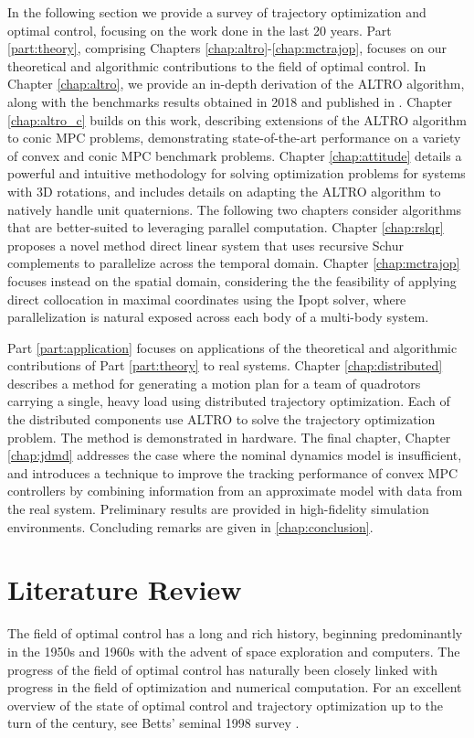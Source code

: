 \documentclass[../root.tex]{subfiles}
\begin{document}
In the following section we provide a survey of trajectory optimization and
optimal control, focusing on the work done in the last 20 years. Part
\ref{part:theory}, comprising Chapters
\ref{chap:altro}-\ref{chap:mctrajop}, focuses on our theoretical and
algorithmic contributions to the field of optimal control. In Chapter
\ref{chap:altro}, we provide an in-depth derivation of the ALTRO algorithm, along
with the benchmarks results obtained in 2018 and published in
\cite{howell_ALTRO_2019}. Chapter \ref{chap:altro_c} builds on this work,
describing extensions of the ALTRO algorithm to conic MPC problems,
demonstrating state-of-the-art performance on a variety of convex and conic MPC 
benchmark problems.
Chapter \ref{chap:attitude} details a powerful and intuitive methodology 
for solving optimization problems for systems with 3D rotations, and includes
details on adapting the ALTRO algorithm to natively handle unit quaternions. 
The following two chapters consider algorithms that are better-suited to 
leveraging parallel computation. Chapter \ref{chap:rslqr} proposes a novel method direct 
linear system that uses recursive Schur complements to parallelize across the temporal 
domain. Chapter \ref{chap:mctrajop} focuses instead on the spatial domain, considering the
the feasibility of applying direct collocation in maximal coordinates using the Ipopt 
solver, where parallelization is natural exposed across each body of a multi-body 
system.

Part \ref{part:application} focuses on applications of the theoretical and 
algorithmic contributions of Part \ref{part:theory} to real systems. 
Chapter \ref{chap:distributed} describes a method for generating a 
motion plan for a team of quadrotors carrying a single, heavy load using 
distributed trajectory optimization. Each of the distributed components 
use ALTRO to solve the trajectory optimization problem. The method 
is demonstrated in hardware. The final chapter, Chapter \ref{chap:jdmd} addresses the 
case where the nominal dynamics model is insufficient, and introduces a technique to 
improve the tracking performance of convex MPC controllers by combining information from 
an approximate model with data from the real system. Preliminary results are provided 
in high-fidelity simulation environments. Concluding remarks are given in 
\ref{chap:conclusion}.


\section{Literature Review} \label{sec:lit_review}
The field of optimal control has a long and rich history, beginning predominantly in the 
1950s and 1960s with the advent of space exploration and computers. The progress of the field of 
optimal control has naturally been closely linked with progress in the field of optimization 
and numerical computation. For an excellent overview of the state of optimal control
and trajectory optimization up to the turn of the century, see Betts' seminal 1998 survey 
\cite{betts_Survey_1998}. 
\end{document}
